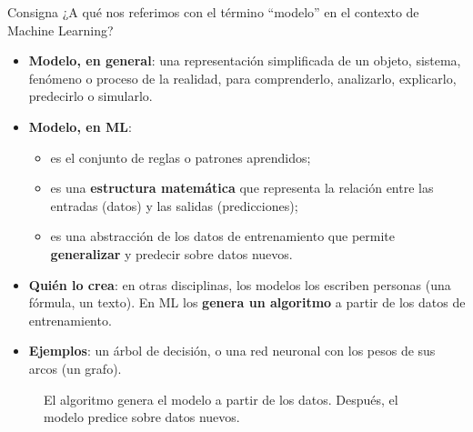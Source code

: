 \documentclass[11pt,a4paper]{article}
\begin{document}
\begin{enunciado}{Consigna}
¿A qué nos referimos con el término ``modelo'' en el contexto de Machine Learning?
\end{enunciado}

\begin{itemize}
  \item \textbf{Modelo, en general}: una representación simplificada de un objeto, sistema, fenómeno o proceso de la realidad, para comprenderlo, analizarlo, explicarlo, predecirlo o simularlo.
  \item \textbf{Modelo, en ML}:
  \begin{itemize}
    \item es el conjunto de reglas o patrones aprendidos;
    \item es una \textbf{estructura matemática} que representa la relación entre las entradas (datos) y las salidas (predicciones);
    \item es una abstracción de los datos de entrenamiento que permite \textbf{generalizar} y predecir sobre datos nuevos.
  \end{itemize}
  \item \textbf{Quién lo crea}: en otras disciplinas, los modelos los escriben personas (una fórmula, un texto). En ML los \textbf{genera un algoritmo} a partir de los datos de entrenamiento.
  \item \textbf{Ejemplos}: un árbol de decisión, o una red neuronal con los pesos de sus arcos (un grafo).
\end{itemize}

\begin{figure}[h]
\centering
{}
\caption{El algoritmo genera el modelo a partir de los datos. Después, el modelo predice sobre datos nuevos.}
\end{figure}
\end{document}
